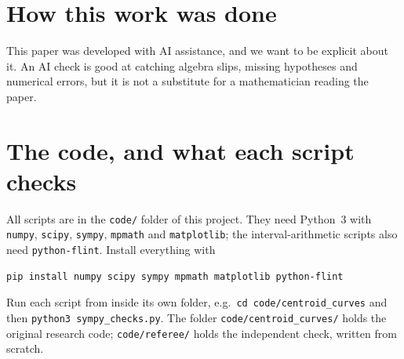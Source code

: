 \documentclass[11pt]{article}
\theoremstyle{plain}
\theoremstyle{definition}
\theoremstyle{remark}
\begin{document}
\section{How this work was done}\label{sec:howmade}

This paper was developed with AI assistance, and we want to be explicit about it. An AI check is good at catching algebra slips, missing hypotheses and numerical errors, but it is not a substitute for a mathematician reading the paper.




\appendix
\section{The code, and what each script checks}\label{app:code}

All scripts are in the \texttt{code/} folder of this project. They need Python~3 with \texttt{numpy}, \texttt{scipy}, \texttt{sympy}, \texttt{mpmath} and \texttt{matplotlib}; the interval-arithmetic scripts also need \texttt{python-flint}. Install everything with
\begin{lstlisting}
pip install numpy scipy sympy mpmath matplotlib python-flint
\end{lstlisting}
Run each script from inside its own folder, e.g.\ \texttt{cd code/centroid\_curves} and then \texttt{python3 sympy\_checks.py}. The folder \texttt{code/centroid\_curves/} holds the original research code; \texttt{code/referee/} holds the independent check, written from scratch.
\end{document}
